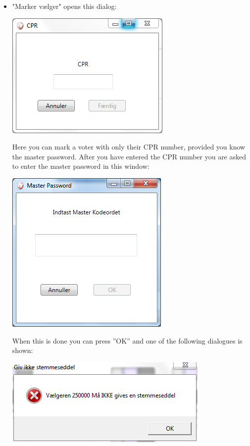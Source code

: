 \documentclass[a4paper]{report}
\begin{document}
\begin{itemize}
\item "Marker v\ae lger" opens this dialog: \\
\begin{center}
\includegraphics{BallotCPR.png}
\end{center}
Here you can mark a voter with only their CPR number, provided you know the master password. After you have entered the CPR number you are asked to enter the master password in this window: \\
\begin{center}
\includegraphics{CheckMasterPassword.png}
\end{center}
When this is done you can press ''OK'' and one of the following dialogues is shown: \\
\begin{center}
 \includegraphics{BallotDenied.png}

\end{center}
\end{itemize}
\end{document}

